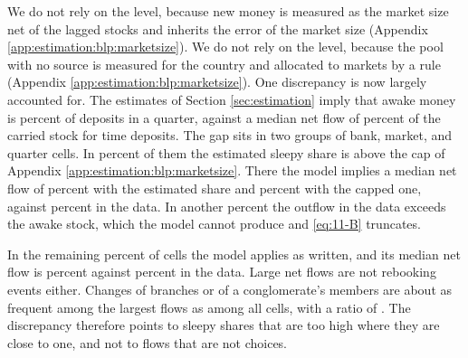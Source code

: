 We do not rely on the level, because new money is measured as the market size net of the lagged stocks and inherits the error of the market size (Appendix \ref{app:estimation:blp:marketsize}). %
We do not rely on the level, because the pool with no source is measured for the country and allocated to markets by a rule (Appendix \ref{app:estimation:blp:marketsize}). %
One discrepancy is now largely accounted for. The estimates of Section \ref{sec:estimation} imply that awake money is  percent of deposits in a quarter, against a median net flow of  percent of the carried stock for time deposits. The gap sits in two groups of bank, market, and quarter cells. In  percent of them the estimated sleepy share is above the cap of Appendix \ref{app:estimation:blp:marketsize}. There the model implies a median net flow of  percent with the estimated share and  percent with the capped one, against  percent in the data. In another  percent the outflow in the data exceeds the awake stock, which the model cannot produce and \eqref{eq:11-B} truncates. %

In the remaining  percent of cells the model applies as written, and its median net flow is  percent against  percent in the data. Large net flows are not rebooking events either. Changes of branches or of a conglomerate's members are about as frequent among the largest flows as among all cells, with a ratio of . The discrepancy therefore points to sleepy shares that are too high where they are close to one, and not to flows that are not choices. %

